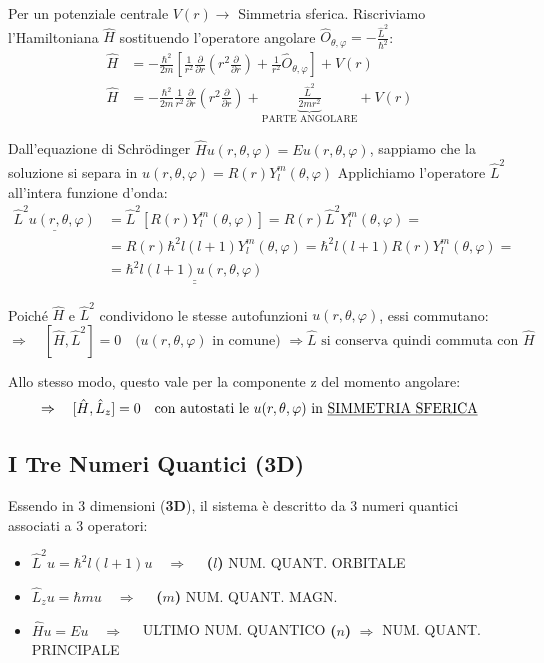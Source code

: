 \documentclass[11pt, a4paper]{article}
\begin{document}
Per un potenziale centrale $V(r) \rightarrow$ Simmetria sferica. %
Riscriviamo l'Hamiltoniana $\hat{H}$ sostituendo l'operatore angolare $\hat{O}_{\theta,\varphi} = -\frac{\hat{L}^2}{\hbar^2}$: %
\begin{align*}
    \hat{H} &= -\frac{\hbar^2}{2m} \left[ \frac{1}{r^2} \frac{\partial}{\partial r} \left( r^2 \frac{\partial}{\partial r} \right) + \frac{1}{r^2} \hat{O}_{\theta,\varphi} \right] + V(r) \\ %
    \hat{H} &= -\frac{\hbar^2}{2m} \frac{1}{r^2} \frac{\partial}{\partial r} \left( r^2 \frac{\partial}{\partial r} \right) + \underbrace{ \frac{\hat{L}^2}{2mr^2} }_{\text{PARTE ANGOLARE}} + V(r) %
\end{align*}

\noindent
Dall'equazione di Schrödinger $\hat{H}u(r,\theta,\varphi) = E u(r,\theta,\varphi)$, sappiamo che la soluzione si separa in $u(r,\theta,\varphi) = R(r)Y_l^m(\theta,\varphi)$ %
Applichiamo l'operatore $\hat{L}^2$ all'intera funzione d'onda: %
\begin{align*}
    \underline{ \hat{L}^2 u(r,\theta,\varphi) } &= \hat{L}^2 [R(r) Y_l^m(\theta,\varphi)] = R(r) \hat{L}^2 Y_l^m(\theta,\varphi) = \\ %
    &= R(r) \hbar^2 l(l+1) Y_l^m(\theta,\varphi) = \hbar^2 l(l+1) R(r) Y_l^m(\theta,\varphi) = \\ %
    &= \underline{\underline{ \hbar^2 l(l+1) u(r,\theta,\varphi) }} %
\end{align*}

Poiché $\hat{H}$ e $\hat{L}^2$ condividono le stesse autofunzioni $u(r,\theta,\varphi)$, essi commutano: %
\begin{equation*}
    \Rightarrow \quad [\hat{H}, \hat{L}^2] = 0 \quad \text{($u(r,\theta,\varphi)$ in comune) $\Rightarrow \hat{L}$ si conserva quindi commuta con $\hat{H}$} %
\end{equation*}

Allo stesso modo, questo vale per la componente z del momento angolare: %
\begin{equation*}
    \Rightarrow \quad [\hat{H}, \hat{L}_z] = 0 \quad \text{con autostati le } u(r,\theta,\varphi) \text{ in \underline{SIMMETRIA SFERICA}} %
\end{equation*}

\subsection{I Tre Numeri Quantici (3D)} %
Essendo in 3 dimensioni (\textbf{3D}), il sistema è descritto da 3 numeri quantici associati a 3 operatori: %
\begin{itemize}
    \item $\hat{L}^2 u = \hbar^2 l(l+1) u \quad \Rightarrow \quad$ \textbf{($l$)} NUM. QUANT. ORBITALE %
    \item $\hat{L}_z u = \hbar m u \quad \Rightarrow \quad$ \textbf{($m$)} NUM. QUANT. MAGN. %
    \item $\hat{H} u = E u \quad \Rightarrow \quad$ ULTIMO NUM. QUANTICO \textbf{($n$)} $\Rightarrow$ NUM. QUANT. PRINCIPALE %
\end{itemize}
\end{document}
